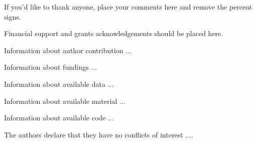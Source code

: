 \documentclass[fist]{svjour3}
\begin{document}
\begin{acknowledgements}
If you'd like to thank anyone, place your comments here
and remove the percent signs.

Financial support and grants acknowledgements should be placed here. 
\end{acknowledgements}


\begin{authorcontribution}
Information about author contribution ...
\end{authorcontribution}

\begin{fundinginformation}
Information about fundings ...
\end{fundinginformation}

\begin{dataavailability}
Information about available data ...
\end{dataavailability}

\begin{materialsavailability}
Information about available material ...
\end{materialsavailability}

\begin{codeavailability}
Information about available code ...
\end{codeavailability}

\begin{ethics}
\begin{conflict}
The authors declare that they have no conflicts of interest ....
\end{conflict}
\end{ethics}


\end{document}
